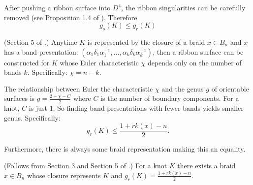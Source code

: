 \documentclass[12pt]{thesis}
\begin{document}
After pushing a ribbon surface into $D^{4}$,
the ribbon singularities can be carefully removed (see Proposition 1.4 of \cite{rudolph-braided-surfaces}).
Therefore 
\begin{equation}
    \label{eq:slice-and-ribbon-genus}
    g_{s}(K) \leq g_{r}(K)
\end{equation}

\begin{proposition} (Section 5 of \cite{rudolph-braided-surfaces}.)
    Anytime $K$ is represented by the closure of a braid $x \in B_{n}$ 
    and $x$ has a band presentation: $(\alpha_{1} \delta_{1} \alpha_{1}^{-1}, \ldots, \alpha_{k} \delta_{k} \alpha_{k}^{-1})$,
    then a ribbon surface can be constructed for $K$ 
    whose Euler characteristic $\chi$ depends only
    on the number of bands $k$.
    Specifically: $\chi = n - k$. 
\end{proposition}

The relationship between Euler the characteristic $\chi$
and the genus $g$ of orientable surfaces is $g = \frac{2 - \chi - C}{2}$ where $C$ is the number
of boundary components. For a knot, $C$ is just $1$.
So finding band presentations with fewer bands yields smaller genus.
Specifically: 
\begin{equation}
    \label{eq:rank-and-ribbon-genus}
    g_{r}(K) \leq \frac{1 + rk(x) - n}{2}.
\end{equation}

Furthermore, there is always some braid representation making this an equality.
\begin{proposition} (Follows from Section 3 and Section 5 of \cite{rudolph-braided-surfaces}.)
    For a knot $K$ there exists a braid $x \in B_{n}$ whose
    closure represents $K$ and
    $g_{r}(K) = \frac{1 + rk(x) - n}{2}$.
\end{proposition}
\end{document}
